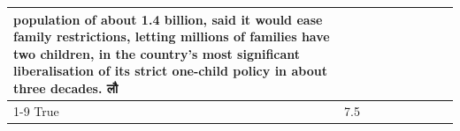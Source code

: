 \begin{table}[H]
\begin{tabular}{lllrlllll}
population of about 1.4 billion, said it would ease family restrictions, letting millions of families have two children, in the country's most significant liberalisation of its strict one-child policy in about three decades. लौ \\
\cline{1-9}
True & 7.5%
\end{tabular}
\end{table}
